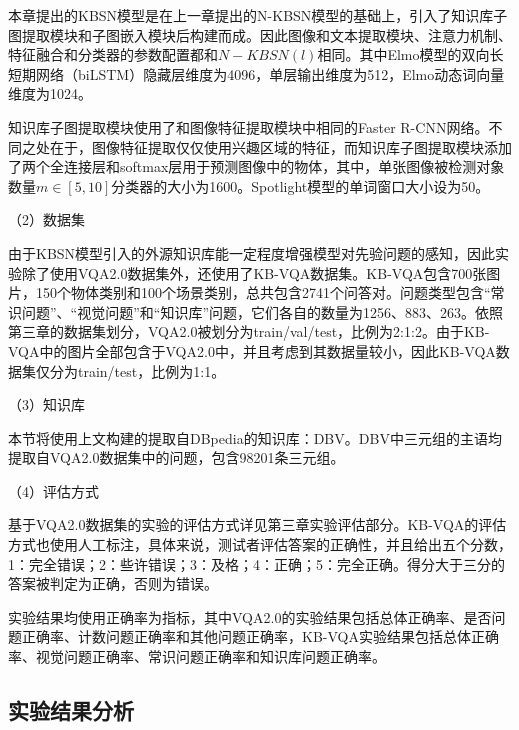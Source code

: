 本章提出的KBSN模型是在上一章提出的N-KBSN模型的基础上，引入了知识库子图提取模块和子图嵌入模块后构建而成。因此图像和文本提取模块、注意力机制、特征融合和分类器的参数配置都和$N-KBSN(l)$相同。其中Elmo模型的双向长短期网络（biLSTM）隐藏层维度为4096，单层输出维度为512，Elmo动态词向量维度为1024。

知识库子图提取模块使用了和图像特征提取模块中相同的Faster R-CNN网络。不同之处在于，图像特征提取仅仅使用兴趣区域的特征，而知识库子图提取模块添加了两个全连接层和softmax层用于预测图像中的物体，其中，单张图像被检测对象数量$m\in [5, 10]$分类器的大小为1600。Spotlight模型的单词窗口大小设为50。

（2）数据集

由于KBSN模型引入的外源知识库能一定程度增强模型对先验问题的感知，因此实验除了使用VQA2.0数据集外，还使用了KB-VQA数据集。KB-VQA包含700张图片，150个物体类别和100个场景类别，总共包含2741个问答对。问题类型包含“常识问题”、“视觉问题”和“知识库”问题，它们各自的数量为1256、883、263。依照第三章的数据集划分，VQA2.0被划分为train/val/test，比例为2:1:2。由于KB-VQA中的图片全部包含于VQA2.0中，并且考虑到其数据量较小，因此KB-VQA数据集仅分为train/test，比例为1:1。

（3）知识库

本节将使用上文构建的提取自DBpedia的知识库：DBV。DBV中三元组的主语均提取自VQA2.0数据集中的问题，包含98201条三元组。

（4）评估方式

基于VQA2.0数据集的实验的评估方式详见第三章实验评估部分。KB-VQA的评估方式也使用人工标注，具体来说，测试者评估答案的正确性，并且给出五个分数，1：完全错误；2：些许错误；3：及格；4：正确；5：完全正确。得分大于三分的答案被判定为正确，否则为错误。

实验结果均使用正确率为指标，其中VQA2.0的实验结果包括总体正确率、是否问题正确率、计数问题正确率和其他问题正确率，KB-VQA实验结果包括总体正确率、视觉问题正确率、常识问题正确率和知识库问题正确率。

\subsection{实验结果分析}
